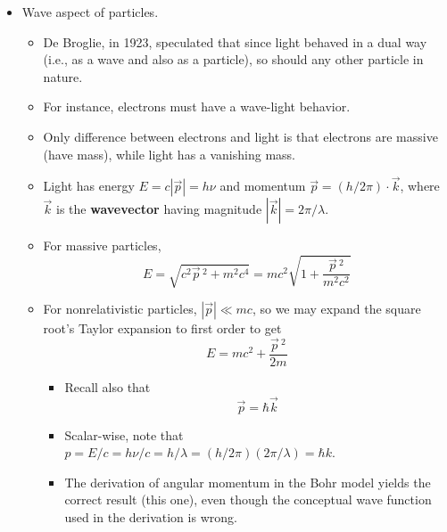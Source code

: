 \documentclass[../notes.tex]{subfiles}
\begin{document}
\begin{itemize}
\begin{itemize}
\begin{equation*}
        \end{equation*}
        \item Since gamma rays are those with $h\nu>\SI{100}{\kilo\electronvolt}$, $\lambda_c$ corresponds to one of these.
        \item For comparison, visible light has a frequency of around \SI{e15}{\hertz}, implying that $h\nu=\SIrange{3}{6}{\electronvolt}$
    \end{itemize}
    \item Wave aspect of particles.
    \begin{itemize}
        \item De Broglie, in 1923, speculated that since light behaved in a dual way (i.e., as a wave and also as a particle), so should any other particle in nature.
        \item For instance, electrons must have a wave-light behavior.
        \item Only difference between electrons and light is that electrons are massive (have mass), while light has a vanishing mass.
        \item Light has energy $E=c|\vec{p}|=h\nu$ and momentum $\vec{p}=(h/2\pi)\cdot\vec{k}$, where $\vec{k}$ is the \textbf{wavevector} having magnitude $|\vec{k}|=2\pi/\lambda$.
        \item For massive particles,
        \begin{equation*}
            E = \sqrt{c^2\vec{p}{\,}^2+m^2c^4} = mc^2\sqrt{1+\frac{\vec{p}{\,}^2}{m^2c^2}}
        \end{equation*}
        \item For nonrelativistic particles, $|\vec{p}|\ll mc$, so we may expand the square root's Taylor expansion to first order to get
        \begin{equation*}
            E = mc^2+\frac{\vec{p}{\,}^2}{2m}
        \end{equation*}
        \begin{itemize}
            \item Recall also that
            \begin{equation*}
                \vec{p} = \hbar\vec{k}
            \end{equation*}
            \item Scalar-wise, note that $p=E/c=h\nu/c=h/\lambda=(h/2\pi)(2\pi/\lambda)=\hbar k$.
            \item The derivation of angular momentum in the Bohr model yields the correct result (this one), even though the conceptual wave function used in the derivation is wrong.

\end{itemize}
\end{itemize}
\end{itemize}
\end{document}
